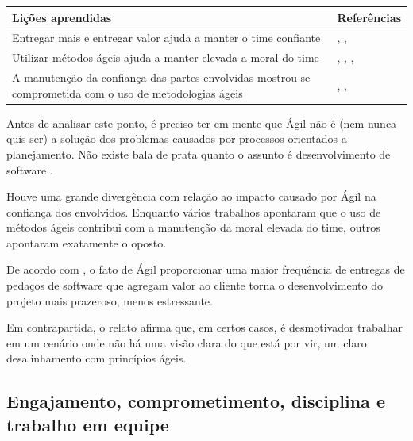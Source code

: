 \begin{table}[H]
	\centering
	\begin{tabularx}{\linewidth}{ | X | p{5cm} | } \hline \textbf{Lições aprendidas} & \textbf{Referências} \\ \hline
		Entregar mais e entregar valor  ajuda a manter o time confiante & \cite{Block2011}, \cite{Asnawi2012}, \cite{Parzinello2012} \\ \hline
		Utilizar métodos ágeis ajuda a manter elevada a moral do time & \cite{Asnawi2012}, \cite{Claudia2013}, \cite{Nokia2013}, \cite{Ahmed2008} \\ \hline
		A manutenção da confiança das partes envolvidas mostrou-se comprometida com o uso de metodologias ágeis & \cite{Nokia2013}, \cite{Piegas2012}, \cite{Bastos2013} \\ \hline
	\end{tabularx}
\end{table}

Antes de analisar este ponto, é preciso ter em mente que Ágil não é (nem nunca quis ser) a solução dos problemas causados por processos orientados a planejamento. Não existe bala de prata quanto o assunto é desenvolvimento de software \cite{Piegas2012,Microsoft2013}.

Houve uma grande divergência com relação ao impacto causado por Ágil na confiança dos envolvidos. Enquanto vários trabalhos apontaram que o uso de métodos ágeis contribui com a manutenção da moral elevada do time, outros apontaram exatamente o oposto.

De acordo com \cite{Asnawi2012}, o fato de Ágil proporcionar uma maior frequência de entregas de pedaços de software que agregam valor ao cliente torna o desenvolvimento do projeto mais prazeroso, menos estressante.

Em contrapartida, o relato \cite{Nokia2013} afirma que, em certos casos, é desmotivador trabalhar em um cenário onde não há uma visão clara do que está por vir, um claro desalinhamento com princípios ágeis.

\subsection{Engajamento, comprometimento, disciplina e trabalho em equipe}

